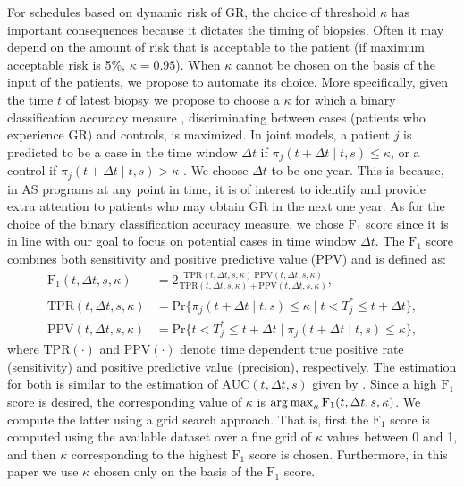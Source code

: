 For schedules based on dynamic risk of GR, the choice of threshold $\kappa$ has important consequences because it dictates the timing of biopsies. Often it may depend on the amount of risk that is acceptable to the patient (if maximum acceptable risk is 5\%, $\kappa = 0.95$). When $\kappa$ cannot be chosen on the basis of the input of the patients, we propose to automate its choice. More specifically, given the time $t$ of latest biopsy we propose to choose a $\kappa$ for which a binary classification accuracy measure \citep{lopez2014optimalcutpoints}, discriminating between cases (patients who experience GR) and controls, is maximized. In joint models, a patient $j$ is predicted to be a case in the time window $\Delta t$ if $\pi_j(t + \Delta t \mid t,s) \leq \kappa$, or a control if $\pi_j(t + \Delta t \mid t,s) > \kappa$ \citep*{rizopoulosJMbayes, landmarking2017}. We choose $\Delta t$ to be one year. This is because, in AS programs at any point in time, it is of interest to identify and provide extra attention to patients who may obtain GR in the next one year. As for the choice of the binary classification accuracy measure, we chose $\mbox{F}_1$ score since it is in line with our goal to focus on potential cases in time window $\Delta t$. The $\mbox{F}_1$ score combines both sensitivity and positive predictive value (PPV) and is defined as:
\begin{align*}
\mbox{F}_1(t, \Delta t, s, \kappa) &= 2\frac{\mbox{TPR}(t, \Delta t, s, \kappa)\ \mbox{PPV}(t, \Delta t, s, \kappa)}{\mbox{TPR}(t, \Delta t, s, \kappa) + \mbox{PPV}(t, \Delta t, s, \kappa)},\\
\mbox{TPR}(t, \Delta t, s, \kappa) &= \mbox{Pr}\big\{\pi_j(t + \Delta t \mid t,s) \leq \kappa \mid t < T^*_j \leq t + \Delta t\big\},\\
\mbox{PPV}(t, \Delta t, s, \kappa) &= \mbox{Pr}\big\{t < T^*_j \leq t + \Delta t \mid \pi_j(t + \Delta t \mid t,s) \leq \kappa \big\},
\end{align*}
where $\mbox{TPR}(\cdot)$ and $\mbox{PPV}(\cdot)$ denote time dependent true positive rate (sensitivity) and positive predictive value (precision), respectively. The estimation for both is similar to the estimation of $\mbox{AUC}(t, \Delta t, s)$ given by \citet{landmarking2017}. Since a high $\mbox{F}_1$ score is desired, the corresponding value of $\kappa$ is $\operatorname{arg\,max}_{\kappa} \mbox{F}_1(t, \Delta t, s, \kappa)$. We compute the latter using a grid search approach. That is, first the $\mbox{F}_1$ score is computed using the available dataset over a fine grid of $\kappa$ values between 0 and 1, and then $\kappa$ corresponding to the highest $\mbox{F}_1$ score is chosen. Furthermore, in this paper we use $\kappa$ chosen only on the basis of the $\mbox{F}_1$ score.